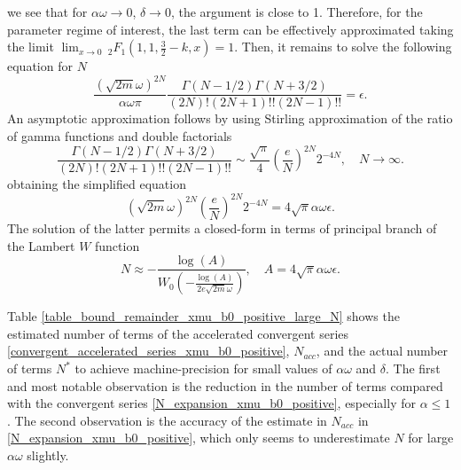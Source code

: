 \documentclass[10pt,a4paper,oneside]{article}
\numberwithin{equation}{section}
\begin{document}
we see that for $\alpha \omega \to 0$, $\delta \to 0$, the argument is close to 1. Therefore, for the parameter regime of interest, the last term can be effectively approximated taking the limit $\lim_{x \to 0}\, _2F_1\left(1, 1, \frac{3}{2}-k, x\right) = 1$. Then, it remains to solve the following equation for $N$ 
\begin{equation}
\frac{(\sqrt{2m} \omega)^{2N}}{\alpha\omega \pi} \frac{\Gamma(N - 1/2)\Gamma(N + 3/2)}{(2N)!(2N + 1)!! (2N - 1)!!} = \epsilon.
\end{equation}
An asymptotic approximation follows by using Stirling approximation of the ratio of gamma functions and double factorials
\begin{equation}
\frac{\Gamma(N - 1/2)\Gamma(N + 3/2)}{(2N)!(2N + 1)!! (2N - 1)!!} \sim \frac{\sqrt{\pi}}{4} \left(\frac{e}{N}\right)^{2N} 2^{-4N}, \quad N \to \infty.
\end{equation}
obtaining the simplified equation
\begin{equation}
(\sqrt{2m} \omega)^{2N} \left(\frac{e}{N}\right)^{2N} 2^{-4N} = 4\sqrt{\pi}\alpha\omega\epsilon.
\end{equation}
The solution of the latter permits a closed-form in terms of principal branch of the Lambert $W$ function
\begin{equation}\label{N_expansion_xmu_acc}
N \approx - \frac{\log(A)}{W_0\left(-\frac{\log(A)}{2 e \sqrt{2m} \omega} \right)}, \quad A = 4\sqrt{\pi}\alpha\omega\epsilon.
\end{equation}

Table \ref{table_bound_remainder_xmu_b0_positive_large_N} shows the estimated number of terms of the accelerated convergent series \eqref{convergent_accelerated_series_xmu_b0_positive}, $N_{acc}$, and the actual number of terms $N^*$ to achieve machine-precision for small values of $\alpha\omega$ and $\delta$. The first and most notable observation is the reduction in the number of terms compared with the convergent series \eqref{N_expansion_xmu_b0_positive}, especially for $\alpha \le 1$. The second observation is the accuracy of the estimate in $N_{acc}$ in \eqref{N_expansion_xmu_b0_positive}, which only seems to underestimate $N$ for large $\alpha\omega$ slightly.
\end{document}
